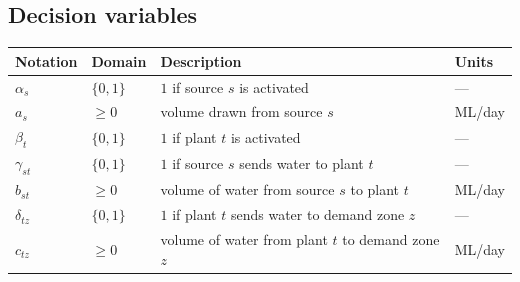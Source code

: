 \documentclass[10pt]{article}
\begin{document}
\subsection{Decision variables}
\begin{center}
    \begin{tabular}{@{}llll@{}}
        \toprule
        \textbf{Notation} & \textbf{Domain} & \textbf{Description}                              & \textbf{Units} \\
        \midrule
        $\alpha_{s}$      & $\{0,1\}$       & $1$ if source $s$ is activated                    & ---            \\
        $a_{s}$           & $\ge 0$         & volume drawn from source $s$                      & ML/day         \\
        $\beta_{t}$       & $\{0,1\}$       & $1$ if plant $t$ is activated                     & ---            \\
        $\gamma_{st}$     & $\{0,1\}$       & $1$ if source $s$ sends water to plant $t$        & ---            \\
        $b_{st}$          & $\ge 0$         & volume of water from source $s$ to plant $t$      & ML/day         \\
        $\delta_{tz}$     & $\{0,1\}$       & $1$ if plant $t$ sends water to demand zone $z$   & ---            \\
        $c_{tz}$          & $\ge 0$         & volume of water from plant $t$ to demand zone $z$ & ML/day         \\
        \bottomrule
    \end{tabular}
\end{center}
\end{document}
